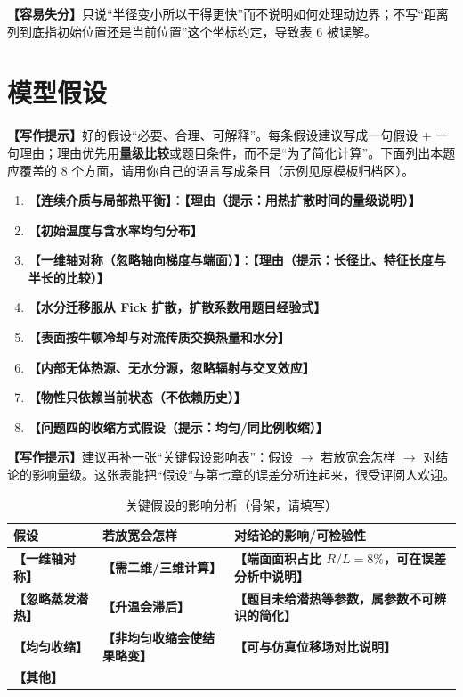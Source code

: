\documentclass[12pt,a4paper]{article}
\newcommand{\prompt}[1]{\par\noindent\textbf{【写作提示】}#1\par}      %
\newcommand{\pitfall}[1]{\par\noindent\textbf{【容易失分】}#1\par}     %
\newcommand{\ph}[1]{\textbf{【#1】}}                                   %
\begin{document}
\pitfall{只说“半径变小所以干得更快”而不说明如何处理动边界；不写“距离列到底指初始位置还是当前位置”这个坐标约定，导致表 6 被误解。}

\clearpage

\section{模型假设}

\prompt{好的假设“必要、合理、可解释”。每条假设建议写成一句假设 + 一句理由；理由优先用\textbf{量级比较}或题目条件，而不是“为了简化计算”。下面列出本题应覆盖的 8 个方面，请用你自己的语言写成条目（示例见原模板归档区）。}

\begin{enumerate}[label=(\arabic*)]
  \item \ph{连续介质与局部热平衡}：\ph{理由（提示：用热扩散时间的量级说明）}
  \item \ph{初始温度与含水率均匀分布}
  \item \ph{一维轴对称（忽略轴向梯度与端面）}：\ph{理由（提示：长径比、特征长度与半长的比较）}
  \item \ph{水分迁移服从 Fick 扩散，扩散系数用题目经验式}
  \item \ph{表面按牛顿冷却与对流传质交换热量和水分}
  \item \ph{内部无体热源、无水分源，忽略辐射与交叉效应}
  \item \ph{物性只依赖当前状态（不依赖历史）}
  \item \ph{问题四的收缩方式假设（提示：均匀/同比例收缩）}
\end{enumerate}

\prompt{建议再补一张“关键假设影响表”：假设 $\rightarrow$ 若放宽会怎样 $\rightarrow$ 对结论的影响量级。这张表能把“假设”与第七章的误差分析连起来，很受评阅人欢迎。}

\begin{table}[H]
\centering
\caption{关键假设的影响分析（骨架，请填写）}
\label{tab:assumption-check}
\begin{tabular}{p{3.2cm}p{5.2cm}p{6.2cm}}
\toprule
假设 & 若放宽会怎样 & 对结论的影响/可检验性\\
\midrule
\ph{一维轴对称} & \ph{需二维/三维计算} & \ph{端面面积占比 $R/L=8\%$，可在误差分析中说明}\\
\ph{忽略蒸发潜热} & \ph{升温会滞后} & \ph{题目未给潜热等参数，属参数不可辨识的简化}\\
\ph{均匀收缩} & \ph{非均匀收缩会使结果略变} & \ph{可与仿真位移场对比说明}\\
\ph{其他} & & \\
\bottomrule
\end{tabular}
\end{table}
\end{document}
